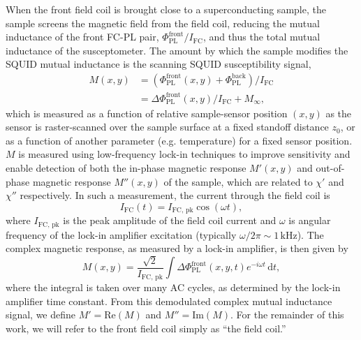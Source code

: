 \documentclass[%
 reprint,
 superscriptaddress,
 amsmath,
 amssymb,
 amsfonts,
 aps,
 prb,
]{revtex4-2}
\newcommand{\FC}{\mathrm{FC}}
\newcommand{\pk}{\mathrm{pk}}
\newcommand{\PL}{\mathrm{PL}}
\renewcommand{\Im}{\mathrm{Im}}
\renewcommand{\Re}{\mathrm{Re}}
\begin{document}
When the front field coil is brought close to a superconducting sample, the sample screens the magnetic field from the field coil, reducing the mutual inductance of the front FC-PL pair, $\Phi^\mathrm{front}_\PL/I_\FC$, and thus the total mutual inductance of the susceptometer. The amount by which the sample modifies the SQUID mutual inductance is the scanning SQUID susceptibility signal,
\begin{equation}
    \begin{split}
        M(x, y)&=\left(\Phi^\mathrm{front}_\PL(x, y)+\Phi^\mathrm{back}_\PL\right)/I_\FC\\
        &=\Delta\Phi_\PL^\mathrm{front}(x, y)/I_\FC + M_\infty,
        \label{eq:def-susc}
        \end{split}
\end{equation}
which is measured as a function of relative sample-sensor position $(x, y)$ as the sensor is raster-scanned over the sample surface at a fixed standoff distance $z_0$, or as a function of another parameter (e.g. temperature) for a fixed sensor position. $M$ is measured using low-frequency lock-in techniques to improve sensitivity and enable detection of both the in-phase magnetic response $M'(x, y)$ and out-of-phase magnetic response $M''(x, y)$ of the sample, which are related to $\chi'$ and $\chi''$ respectively. In such a measurement, the current through the field coil is
\begin{equation}
    \label{eq:I_FC}
    I_\FC(t)=I_{\FC,\,\pk}\cos(\omega t),
\end{equation}
where $I_{\FC,\,\pk}$ is the peak amplitude of the field coil current and $\omega$ is angular frequency of the lock-in amplifier excitation (typically $\omega/2\pi\sim 1\,\mathrm{kHz}$). The complex magnetic response, as measured by a lock-in amplifier, is then given by
\begin{equation}
    \label{eq:M-integral}
    M(x, y)=\frac{\sqrt{2}}{I_{\FC,\,\pk}}\int \Delta\Phi^\mathrm{front}_\PL(x, y, t)e^{-i\omega t}\,\mathrm{d}t,
\end{equation}
where the integral is taken over many AC cycles, as determined by the lock-in amplifier time constant. From this demodulated complex mutual inductance signal, we define $M'=\Re(M)$ and $M''=\Im(M)$. For the remainder of this work, we will refer to the front field coil simply as ``the field coil.''
\end{document}
